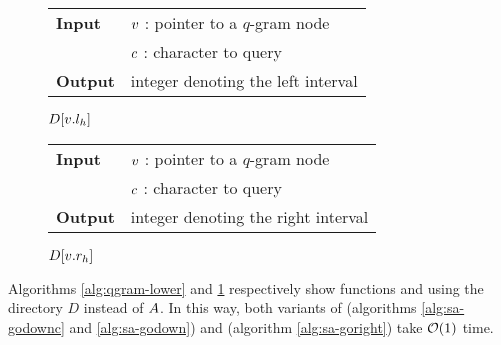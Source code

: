 \begin{figure*}[b!]
\begin{minipage}[b]{.5\textwidth}
\begin{algorithm}[H]
\begin{tabular}{ll}
\textbf{Input}  & $v$ : pointer to a $q$-gram node\\
				& $c$ : character to query\\
\textbf{Output} & integer denoting the left interval\\
\end{tabular}
\begin{algorithmic}[1]
\State \Return $D[v.l_h]$
\end{algorithmic}
\label{alg:qgram-lower}
\end{algorithm}
\end{minipage}
\hfill
\begin{minipage}[b]{.5\textwidth}
\begin{algorithm}[H]
\begin{tabular}{ll}
\textbf{Input}  & $v$ : pointer to a $q$-gram node\\
				& $c$ : character to query\\
\textbf{Output} & integer denoting the right interval\\
\end{tabular}
\begin{algorithmic}[1]
\State \Return $D[v.r_h]$
\end{algorithmic}
\label{alg:qgram-upper}
\end{algorithm}
\end{minipage}
\end{figure*}

Algorithms \ref{alg:qgram-lower} and \ref{alg:qgram-upper} respectively show functions  and  using the directory $D$ instead of $A$.
In this way, both variants of  (algorithms \ref{alg:sa-godownc} and \ref{alg:sa-godown}) and  (algorithm \ref{alg:sa-goright}) take $\mathcal{O}(1)$ time.

